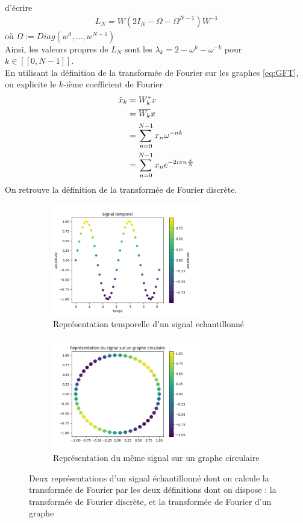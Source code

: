 d'écrire
\begin{align}
    L_N = W(2I_N -\Omega-\Omega^{N-1})W^{-1}
\end{align}
où $\Omega := Diag(w^0,...,w^{N-1})$\\
Ainsi, les valeurs propres de $L_N$ sont les $\lambda_k = 2 - \omega^k - \omega^{-k}$ pour $k \in [\![0,N-1]\!]$.\\
En utilisant la définition de la transformée de Fourier sur les graphes \ref{eq:GFT}, on explicite le $k$-ième coefficient de Fourier
\begin{align}
    \Tilde{x}_k &= W_k^*x\\
    &= \overline{W_k}x\\
    &= \sum_{n=0}^{N-1}x_n\omega^{-nk} \\
    &= \sum_{n=0}^{N-1}x_n e^{-2i\pi n\frac{k}{N}}
\end{align}
On retrouve la définition de la transformée de Fourier discrète.

\begin{figure}[h]
  \centering
  \begin{subfigure}{0.35\linewidth}
    \includegraphics[width=6.5cm]{img/temporal_signal.png}
    \caption{Représentation temporelle d'un signal echantillonné}
    \label{fig:DANN_1}
  \end{subfigure}
  \hspace{1.5cm}
  \begin{subfigure}{0.35\linewidth}
    \includegraphics[width=6.5cm]{img/graph_signal.png}
    \caption{Représentation du même signal sur un graphe circulaire}
    \label{fig:DANN_2}
  \end{subfigure}
  \caption{Deux représentations d'un signal échantillonné dont on calcule la transformée de Fourier par les deux définitions dont on dispose : la transformée de Fourier discrète, et la transformée de Fourier d'un graphe}
  \label{fig:DANN
}
\end{figure}